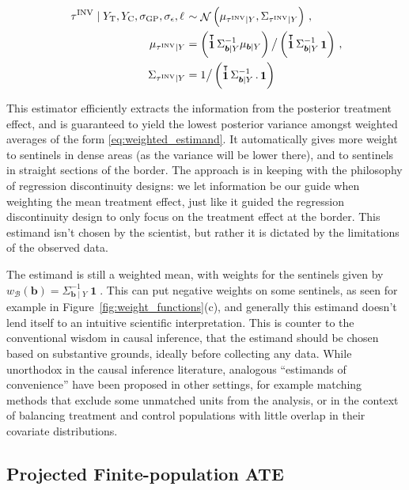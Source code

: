 \documentclass[letter]{article}
\DeclareMathOperator{\normal}{\mathcal{N}}
\DeclareMathOperator{\ones}{\mathbf{1}}
\newcommand{\trans}{^{\intercal}}
\newcommand{\treat}{\mathrm{T}}
\newcommand{\ctrol}{\mathrm{C}}
\newcommand{\sigmaf}{\sigma_{\mathrm{GP}}}
\newcommand{\sigman}{\sigma_{\epsilon}}
\newcommand{\border}{\mathcal{B}}
\newcommand{\sentinels}{\bm{b}}
\newcommand{\invvar}{\tau^{\mathrm{INV}}}
\newcommand{\eqlabel}[1]{\label{#1}}
\newcommand{\weightb}{w_{\border}}
\renewcommand{\cite}[1]{\citep{#1}}
\begin{document}
\begin{equation}
\begin{split}
    \left. \invvar \mid Y_\treat{}, Y_\ctrol{}, \sigmaf, \sigman, \ell \right. &\sim \normal\del{\mu_{\invvar \mid Y}, \Sigma_{\invvar \mid Y}} \,, \\
    \mu_{\invvar \mid Y} &= \del{\ones\trans \Sigma_{\sentinels \mid Y}^{-1} \mu_{\sentinels \mid Y}} \big/ \del{\ones\trans \Sigma_{\sentinels \mid Y}^{-1} \ones} \,, \\
    \Sigma_{\invvar \mid Y} &= 1 \big/ \del{\ones\trans \Sigma_{\sentinels \mid Y}^{-1} \,. \ones}
\end{split}
\eqlabel{eq:invvar}
\end{equation}

This estimator efficiently extracts the information from the posterior treatment effect, and is guaranteed to yield the lowest posterior variance amongst weighted averages of the form \eqref{eq:weighted_estimand}.
It automatically gives more weight to sentinels in dense areas (as the variance will be lower there), and to sentinels in straight sections of the border.
The approach is in keeping with the philosophy of regression discontinuity designs: we let information be our guide when weighting the mean treatment effect, just like it guided the regression discontinuity design to only focus on the treatment effect at the border.
This estimand isn't chosen by the scientist, but rather it is dictated by the limitations of the observed data.

The estimand is still a weighted mean, with weights for the sentinels given by \(\weightb(\sentinels) = \Sigma_{\sentinels \mid Y}^{-1} \ones\).
This can put negative weights on some sentinels, as seen for example in Figure~\ref{fig:weight_functions}(c), and generally this estimand doesn't lend itself to an intuitive scientific interpretation.
This is counter to the conventional wisdom in causal inference, that the estimand should be chosen based on substantive grounds, ideally before collecting any data.
While unorthodox in the causal inference literature, analogous ``estimands of convenience'' have been proposed in other settings, for example matching methods that exclude some unmatched units from the analysis, or \cite{li2016balancing} in the context of balancing treatment and control populations with little overlap in their covariate distributions.
    


    	\subsection{Projected Finite-population ATE}\label{projected-finite-population-ate}
\end{document}
